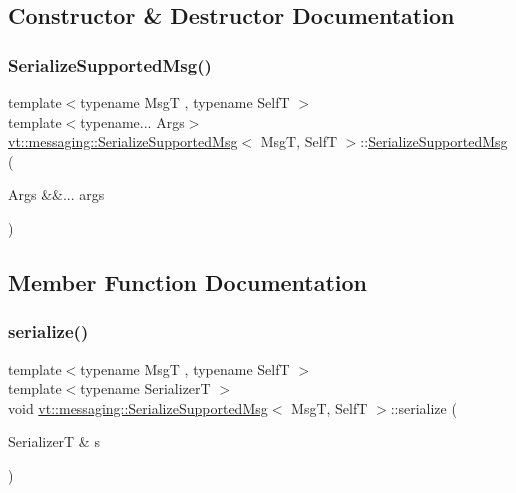 \subsection{Constructor \& Destructor Documentation}
\mbox{\label{structvt_1_1messaging_1_1_serialize_supported_msg_a38a364cb0fdfb2822d4b65dcba7d05ef}} 
\subsubsection{\texorpdfstring{Serialize\+Supported\+Msg()}{SerializeSupportedMsg()}}
{\footnotesize\ttfamily template$<$typename MsgT , typename SelfT $>$ \\
template$<$typename... Args$>$ \\
\hyperlink{structvt_1_1messaging_1_1_serialize_supported_msg}{vt\+::messaging\+::\+Serialize\+Supported\+Msg}$<$ MsgT, SelfT $>$\+::\hyperlink{structvt_1_1messaging_1_1_serialize_supported_msg}{Serialize\+Supported\+Msg} (\begin{DoxyParamCaption}\item[{Args \&\&...}]{args }\end{DoxyParamCaption})\hspace{0.3cm}{\ttfamily [inline]}}



\subsection{Member Function Documentation}
\mbox{\label{structvt_1_1messaging_1_1_serialize_supported_msg_a361827e8eb53fbd212b8f702485ff297}} 
\subsubsection{\texorpdfstring{serialize()}{serialize()}}
{\footnotesize\ttfamily template$<$typename MsgT , typename SelfT $>$ \\
template$<$typename SerializerT $>$ \\
void \hyperlink{structvt_1_1messaging_1_1_serialize_supported_msg}{vt\+::messaging\+::\+Serialize\+Supported\+Msg}$<$ MsgT, SelfT $>$\+::serialize (\begin{DoxyParamCaption}\item[{SerializerT \&}]{s }\end{DoxyParamCaption})\hspace{0.3cm}{\ttfamily [inline]}}




